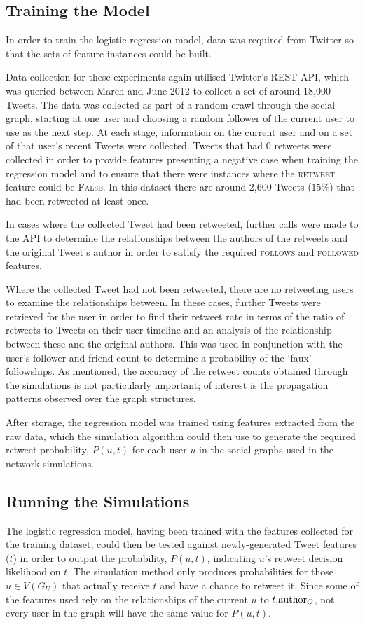 \subsection{Training the Model}
In order to train the logistic regression model, data was required from Twitter so that the sets of feature instances could be built. 

Data collection for these experiments again utilised Twitter's REST API, which was queried between March and June 2012 to collect a set of around 18,000 Tweets. The data was collected as part of a random crawl through the social graph, starting at one user and choosing a random follower of the current user to use as the next step. At each stage, information on the current user and on a set of that user's recent Tweets were collected. Tweets that had 0 retweets were collected in order to provide features presenting a negative case when training the regression model and to ensure that there were instances where the \textsc{retweet} feature could be \textsc{False}. In this dataset there are around 2,600 Tweets (15\%) that had been retweeted at least once.

In cases where the collected Tweet had been retweeted, further calls were made to the API to determine the relationships between the authors of the retweets and the original Tweet's author in order to satisfy the required \textsc{follows} and \textsc{followed} features.

Where the collected Tweet had not been retweeted, there are no retweeting users to examine the relationships between. In these cases, further Tweets were retrieved for the user in order to find their retweet rate in terms of the ratio of retweets to Tweets on their user timeline and an analysis of the relationship between these and the original authors. This was used in conjunction with the user's follower and friend count to determine a probability of the `faux' followships. As mentioned, the accuracy of the retweet counts obtained through the simulations is not particularly important; of interest is the propagation patterns observed over the graph structures.

After storage, the regression model was trained using features extracted from the raw data, which the simulation algorithm could then use to generate the required retweet probability, $P(u,t)$ for each user $u$ in the social graphs used in the network simulations.


\subsection{Running the Simulations}
The logistic regression model, having been trained with the features collected for the training dataset, could then be tested against newly-generated Tweet features ($t$) in order to output the probability, $P(u,t)$, indicating $u$'s retweet decision likelihood on $t$. The simulation method only produces probabilities for those $u \in V(G_U)$ that actually receive $t$ and have a chance to retweet it. Since some of the features used rely on the relationships of the current $u$ to $t.\textrm{author}_O$, not every user in the graph will have the same value for $P(u,t)$.

